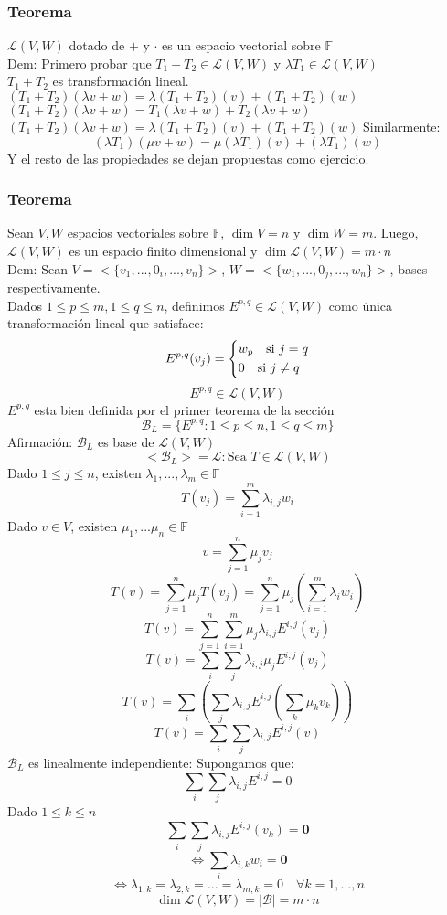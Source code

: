 \documentclass[11pt]{book}
\renewcommand{\vec}[1]{\mathbf{#1}}
\theoremstyle{definition}
\begin{document}
\subsubsection{Teorema}
$\mathcal{L}(V,W)$ dotado de $+$ y $\cdot$ es un espacio vectorial sobre $\mathbb{F}$\\
Dem: Primero probar que $T_1+T_2\in\mathcal{L}(V,W)$ y $\lambda T_1\in\mathcal{L}(V,W)$\\
$T_1+T_2$ es transformación lineal.\\
$(T_1+T_2)(\lambda v+w)=\lambda(T_1+T_2)(v)+(T_1+T_2)(w)$
$(T_1+T_2)(\lambda v+w)=T_1(\lambda v+w)+T_2(\lambda v+w)$
$(T_1+T_2)(\lambda v+w)=\lambda(T_1+T_2)(v)+(T_1+T_2)(w)$
Similarmente:
\[
	(\lambda T_1)(\mu v+w)=\mu(\lambda T_1)(v)+(\lambda T_1)(w)
\]
Y el resto de las propiedades se dejan propuestas como ejercicio.
\subsubsection{Teorema}
Sean $V,W$ espacios vectoriales sobre $\mathbb{F}$, $\dim V=n$ y $\dim W=m$. Luego, $\mathcal{L}(V,W)$ es un espacio finito dimensional y $\dim\mathcal{L}(V,W)=m\cdot n$\\
Dem: Sean $V=<\{v_1,...,0_i,...,v_n\}>$, $W=<\{w_1,...,0_j,...,w_n\}>$, bases respectivamente.\\
Dados $1\leq p\leq m, 1\leq q\leq n$, definimos $E^{p,q}\in\mathcal{L}(V,W)$ como única transformación lineal que satisface:
\[
	E^{p,q}(v_j)=
	\begin{dcases}
		w_p\quad\textrm{si }j=q \\
		0\quad\textrm{si } j\neq q
	\end{dcases}
\]
\[
	E^{p,q}\in\mathcal{L}(V,W)
\]
$E^{p,q}$ esta bien definida por el primer teorema de la sección
\[
	\mathcal{B}_L=\{E^{p,q}:1\leq p\leq n,1\leq q\leq m\}
\]
Afirmación: $\mathcal{B}_L$ es base de $\mathcal{L}(V,W)$
\[
	<\mathcal{B}_L>=\mathcal{L}:\textrm{Sea }T\in\mathcal{L}(V,W)
\]
Dado $1\leq j\leq n$, existen $\lambda_1,...,\lambda_m\in\mathbb{F}$
\[
	T(v_j)=\sum^m_{i=1}\lambda_{i,j}w_i
\]
Dado $v\in V$, existen $\mu_1,...\mu_n\in\mathbb{F}$
\[
	v=\sum^n_{j=1}\mu_jv_j
\]
\[
	T(v)=\sum^n_{j=1}\mu_jT(v_j)=\sum^n_{j=1}\mu_j(\sum^m_{i=1}\lambda_iw_i)
\]
\[
	T(v)=\sum^n_{j=1}\sum^m_{i=1}\mu_j\lambda_{i,j}E^{i,j}(v_j)
\]
\[
	T(v)=\sum_i\sum_j\lambda_{i,j}\mu_jE^{i,j}(v_j)
\]
\[
	T(v)=\sum_i\left(\sum_j\lambda_{i,j}E^{i,j}\left(\sum_k\mu_kv_k\right)\right)
\]
\[
	T(v)=\sum_i\sum_j\lambda_{i,j}E^{i,j}(v)
\]
$\mathcal{B}_L$ es linealmente independiente: Supongamos que:
\[
	\sum_i\sum_j\lambda_{i,j}E^{i,j}=0
\]
Dado $1\leq k\leq n$
\[
	\sum_i\sum_j\lambda_{i,j}E^{i,j}(v_k)=\vec{0}
\]
\[
	\iff \sum_i\lambda_{i,k}w_i=\vec{0}
\]
\[
	\iff \lambda_{1,k}=\lambda_{2,k}=...=\lambda_{m,k}=0\quad \forall k=1,...,n
\]
\[
	\dim\mathcal{L}(V,W)=|\mathcal{B}|=m\cdot n
\]
\end{document}
